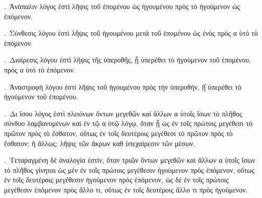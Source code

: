 \begin{Parallel}{}{}
{.~{\greekfont Ἀνάπαλιν λόγος ἐστὶ λῆψις τοῦ ἑπομένου ὡς
ἡγουμένου πρὸς τὸ ἡγούμενον ὡς ἑπόμενον.}

.~{\greekfont Σύνθεσις λόγου ἐστὶ λῆψις τοῦ ἡγουμένου μετὰ τοῦ
ἑπομένου ὡς ἑνὸς πρὸς α ὐτὸ τὸ ἑπόμενον.}

.~{\greekfont Διαίρεσις λόγου ἐστὶ λῆψις τῆς ὑπεροθῆς, ᾗ ὑπερέθει
τὸ ἡγούμενον τοῦ ἑπομένου, πρὸς α ὐτὸ τὸ ἑπόμενον.}

.~{\greekfont Ἀναστροφὴ λόγου ἐστὶ λῆψις τοῦ ἡγουμένου πρὸς
τὴν ὑπεροθήν, ῇ̔ ὑπερέθει τὸ ἡγούμενον τοῦ
ἑπομένου.}

.~{\greekfont Δι ἴσου λόγος ἐστὶ πλειόνων ὄντων μεγεθῶν καὶ
ἄλλων α ὐτοῖς ἴσων τὸ πλῆθος σύνδυο λαμβανομένων
καὶ ἐν τῷ α ὐτῷ λόγῳ, ὅταν ᾖ ὡς ἐν τοῖς πρώτοις
μεγέθεσι τὸ πρῶτον πρὸς τὸ ἔσθατον, οὕτως ἐν τοῖς
δευτέροις μεγέθεσι τὸ πρῶτον πρὸς τὸ ἔσθατον; ἢ ἄλλως;
λῆψις τῶν ἄκρων καθ ὑπεχαίρεσιν τῶν  μέσων.}

.~{\greekfont Τεταραγμένη δὲ ἀναλογία ἐστίν, ὅταν τριῶν ὄντων
μεγεθῶν καὶ ἄλλων α ὐτοῖς ἴσων τὸ πλῆθος
γίνηται ὡς μὲν ἐν τοῖς πρώτοις μεγέθεσιν ἡγούμενον πρὸς
ἐπόμενον, οὕτως  ἐν τοῖς δευτέροις μεγέθεσιν
ἡγούμενον πρὸς ἑπόμενον, ὡς δὲ ἐν τοῖς πρώτοις
μεγέθεσιν ἑπόμενον πρὸς ἄλλο τι, οὕτως ἐν τοῖς
δευτέροις ἄλλο τι πρὸς ἡγούμενον.}}

\end{Parallel}
